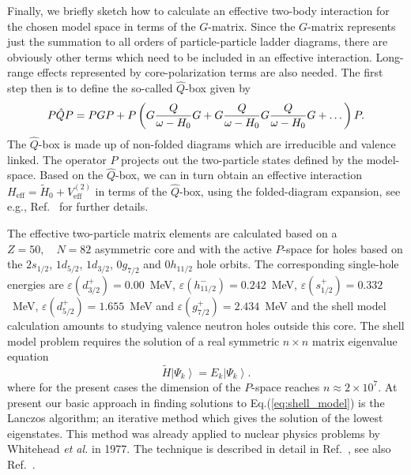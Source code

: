 \documentclass{ws-p9-75x6-50}
\begin{document}
Finally, we briefly sketch how to calculate an effective 
two-body interaction for the chosen model space
in terms of the $G$-matrix.  Since the $G$-matrix represents just
the summation to all orders of particle-particle
ladder diagrams, there are obviously other terms which need to be included
in an effective interaction. Long-range effects represented by 
core-polarization terms are also needed.
The first step then is to define the so-called $\hat{Q}$-box given by
\begin{equation}
   P\hat{Q}P=PGP +
   P\left(G\frac{Q}{\omega-H_{0}}G\\ + G
   \frac{Q}{\omega-H_{0}}G \frac{Q}{\omega-H_{0}}G +\dots\right)P.
   \label{eq:qbox}
\end{equation}
The $\hat{Q}$-box is made up of non-folded diagrams which are irreducible
and valence linked. The operator $P$ projects out the two-particle states defined
by the model-space.
Based on the $\hat{Q}$-box, we can in turn obtain 
an effective interaction
$H_{\mathrm{eff}}=\widetilde{H}_0+V_{\mathrm{eff}}^{(2)}$ in terms of the $\hat{Q}$-box,
 using the folded-diagram expansion, see e.g., Ref.\  \cite{hko95} for further details.

The effective two-particle matrix elements are calculated based on 
a $Z = 50, \quad N = 82$ asymmetric core and with the active $P$-space for holes
based on the $2s_{1/2}$, $1d_{5/2}$, $1d_{3/2}$, $0g_{7/2}$ and $0h_{11/2}$
hole orbits.
The corresponding single-hole energies are
$\varepsilon(d_{3/2}^{+}) = 0.00$~MeV, 
 $\varepsilon(h_{11/2}^{-}) = 0.242$~MeV, $\varepsilon(s_{1/2}^{+}) = 0.332$~MeV,
$\varepsilon(d_{5/2}^{+}) = 1.655$~MeV and  $\varepsilon(g_{7/2}^{+}) = 2.434$~MeV
and the shell model calculation amounts to studying
valence neutron holes outside this core.
The shell model problem requires the solution of a real symmetric
$n \times n$ matrix eigenvalue equation
%
\begin{equation}
       \widetilde{H}\left | \Psi_k\right\rangle  = 
       E_k \left | \Psi_k\right\rangle .
       \label{eq:shell_model}
\end{equation}
%
where for the present cases the dimension of the $P$-space reaches $n \approx 2 \times 10^{7}$.
At present our basic approach in finding solutions to Eq.(\ref{eq:shell_model})
is the Lanczos algorithm; an iterative method
which gives the solution of the lowest eigenstates. This method was 
already applied to nuclear physics problems by Whitehead {\sl et al.} 
in 1977. The technique is described in detail in Ref.\ \cite{whit77}, 
see also Ref.\ \cite{ehho95}. 
\end{document}

